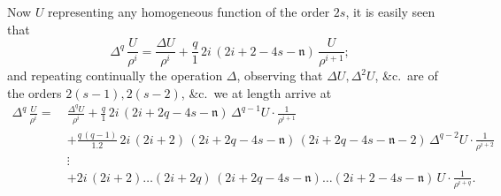 \documentclass[11pt]{article}
\begin{document}
\clearpage

Now $U$ representing any homogeneous function of the order $2s$, it is easily seen that
\[
\Delta^{q}\,\frac{U}{\rho^{i}} = \frac{\Delta U}{\rho^{i}} + \frac{q}{1}\,2i\,(2i + 2 - 4s - \mathfrak{n})\,\frac{U}{\rho^{i+1}};
\]
and repeating continually the operation $\Delta$, observing that $\Delta U, \Delta^{2}U$, \&c.\ are of the orders $2(s-1), 2(s-2)$, \&c.\ we at length arrive at
\[
\begin{aligned}
\Delta^{q}\,\frac{U}{\rho^{i}} =\ & \frac{\Delta^{q}U}{\rho^{i}} + \frac{q}{1}\,2i\,(2i + 2q - 4s - \mathfrak{n})\,\Delta^{q-1}U\cdot\frac{1}{\rho^{i+1}} \\
& + \frac{q\,(q-1)}{1.2}\,2i\,(2i + 2)\,(2i + 2q - 4s - \mathfrak{n})\,(2i + 2q - 4s - \mathfrak{n} - 2)\,\Delta^{q-2}U\cdot\frac{1}{\rho^{i+2}} \\
& \vdots \\
& + 2i\,(2i + 2)\ldots(2i + 2q)\,(2i + 2q - 4s - \mathfrak{n})\ldots(2i + 2 - 4s - \mathfrak{n})\,U\cdot\frac{1}{\rho^{i+q}}.
\end{aligned}
\]
\end{document}
